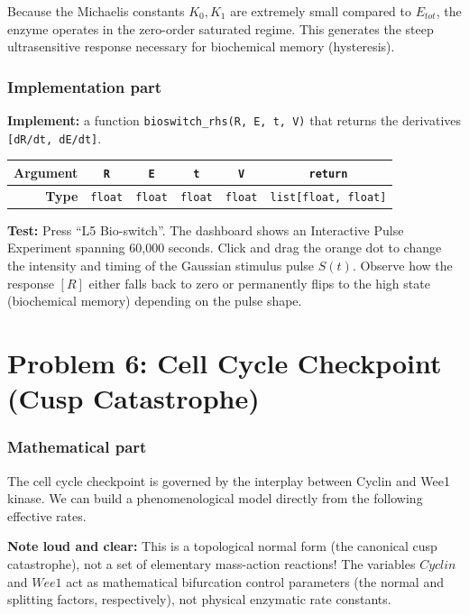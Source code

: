 \documentclass[11pt]{article}
\begin{document}
Because the Michaelis constants $K_0, K_1$ are extremely small compared to $E_{tot}$, the enzyme operates in the zero-order saturated regime. This generates the steep ultrasensitive response necessary for biochemical memory (hysteresis).


\subsubsection*{Implementation part}
\textbf{Implement:} a function \lstinline|bioswitch_rhs(R, E, t, V)| that returns the derivatives \lstinline|[dR/dt, dE/dt]|.

\begin{center}
\renewcommand{\arraystretch}{2.0}
\begin{tabular}{r | c | c | c | c | c}
\toprule
\textbf{Argument} & \lstinline|R| & \lstinline|E| & \lstinline|t| & \lstinline|V| & \lstinline|return| \\ \midrule
\textbf{Type} & \lstinline|float| & \lstinline|float| & \lstinline|float| & \lstinline|float| & \lstinline|list[float, float]| \\
\bottomrule
\end{tabular}
\end{center}

\textbf{Test:} Press ``L5 Bio-switch''. The dashboard shows an Interactive Pulse Experiment spanning 60,000 seconds. Click and drag the orange dot to change the intensity and timing of the Gaussian stimulus pulse $S(t)$. Observe how the response $[R]$ either falls back to zero or permanently flips to the high state (biochemical memory) depending on the pulse shape.

\section*{Problem 6: Cell Cycle Checkpoint (Cusp Catastrophe)}

\subsubsection*{Mathematical part}

The cell cycle checkpoint is governed by the interplay between Cyclin and Wee1 kinase. We can build a phenomenological model directly from the following effective rates. 

\textbf{Note loud and clear:} This is a topological normal form (the canonical cusp catastrophe), not a set of elementary mass-action reactions! The variables $Cyclin$ and $Wee1$ act as mathematical bifurcation control parameters (the normal and splitting factors, respectively), not physical enzymatic rate constants.
\end{document}
